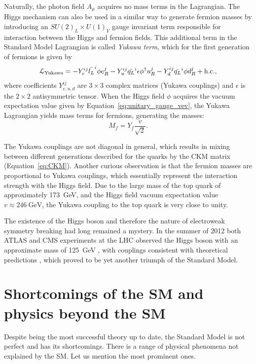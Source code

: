 Naturally, the photon field $A_\mu$ acquires no mass terms in the Lagrangian. The Higgs mechanism can also be used in a
similar way to generate fermion masses by introducing an $SU(2)_L \times U(1)_Y$ gauge invariant term responsible for
interaction between the Higgs and fermion fields. This additional term in the Standard Model Lagrangian is called
\textit{Yukawa term}, which for the first generation of fermions is given by
\begin{equation}
\mathcal{L}_\textrm{Yukawa} = -Y_e^{ij} \bar{l_L}^i \phi e_R^j - Y_u^{ij} \bar{q_L}^i \epsilon \phi^\dag u_R^j - Y_d^{ij}
\bar{q_L}^i \phi d_R^j + \textrm{h.c.},
\end{equation}
where coefficients $Y_{e,u,d}^{ij}$ are $3\times3$ complex matrices (Yukawa couplings) and $\epsilon$ is the $2\times2$
antisymmetric tensor. When the Higgs field $\phi$ acquires the vacuum expectation value given by
Equation~\ref{eq:unitary_gauge_vev}, the Yukawa Lagrangian yields mass terms for fermions, generating the masses:
\begin{equation}
M_f = Y_f \frac{v}{\sqrt{2}}.
\end{equation}

The Yukawa couplings are not diagonal in general, which results in mixing between different generations described for
the quarks by the CKM matrix (Equation~\ref{eq:CKM}). Another curious observation is that the fermion masses are
proportional to Yukawa couplings, which essentially represent the interaction strength with the Higgs field. Due to the
large mass of the top quark of approximately \SI{173}{\GeV}, and the Higgs field vacuum expectation value
$v\approx\SI{246}{\GeV}$, the Yukawa coupling to the top quark is very close to unity.

The existence of the Higgs boson and therefore the nature of electroweak symmetry breaking had long remained a mystery.
In the summer of 2012 both ATLAS and CMS experiments at the LHC observed the Higgs boson with an approximate mass of
\SI{125}{\GeV} \autocite{ATLAS_higgs_observation, CMS_higgs_observation}, with couplings consistent with theoretical
predictions \autocite{CMS_Higgs_long_paper, ATLAS_Higgs_couplings}, which proved to be yet another triumph of the
Standard Model.

\section{Shortcomings of the SM and physics beyond the SM}
\label{s:SM_shortcomings}
Despite being the most successful theory up to date, the Standard Model is not perfect and has its shortcomings. There
is a range of physical phenomena not explained by the SM. Let us mention the most prominent ones.

